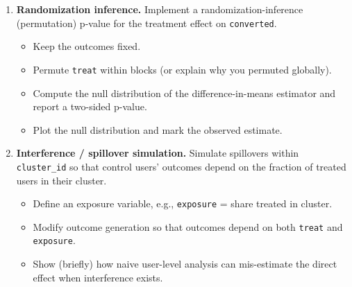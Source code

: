 \documentclass[11pt]{article}
\begin{document}
\begin{enumerate}[label=(\alph*)]
\item \textbf{Randomization inference.}
Implement a randomization-inference (permutation) p-value for the treatment effect on \texttt{converted}.
\begin{itemize}
  \item Keep the outcomes fixed.
  \item Permute \texttt{treat} within blocks (or explain why you permuted globally).
  \item Compute the null distribution of the difference-in-means estimator and report a two-sided p-value.
  \item Plot the null distribution and mark the observed estimate.
\end{itemize}

\item \textbf{Interference / spillover simulation.}
Simulate spillovers within \texttt{cluster\_id} so that control users’ outcomes depend on the fraction of treated users in their cluster.
\begin{itemize}
  \item Define an exposure variable, e.g., \texttt{exposure} = share treated in cluster.
  \item Modify outcome generation so that outcomes depend on both \texttt{treat} and \texttt{exposure}.
  \item Show (briefly) how naive user-level analysis can mis-estimate the direct effect when interference exists.
\end{itemize}
\end{enumerate}
\end{document}
